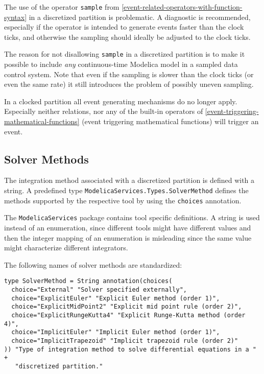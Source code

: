The use of the operator \lstinline!sample! from \cref{event-related-operators-with-function-syntax} in a discretized partition is problematic.
A diagnostic is recommended, especially if the operator is intended to generate events faster than the clock ticks, and otherwise the sampling should ideally be adjusted to the clock ticks.

\begin{nonnormative}
The reason for not disallowing \lstinline!sample! in a discretized partition is to make it possible to include \emph{any} continuous-time Modelica model in a sampled data control system.
Note that even if the sampling is slower than the clock ticks (or even the same rate) it still introduces the problem of possibly uneven sampling.
\end{nonnormative}

In a clocked partition all event generating mechanisms do no longer apply.
Especially neither relations, nor any of the built-in operators of \cref{event-triggering-mathematical-functions} (event triggering mathematical functions) will trigger an event.

\subsection{Solver Methods}\label{solver-methods}

The integration method associated with a discretized partition is defined with a string.
A predefined type \lstinline!ModelicaServices.Types.SolverMethod! defines the methods supported by the respective tool by using the \lstinline!choices! annotation.

\begin{nonnormative}
The \lstinline!ModelicaServices! package contains tool specific definitions.
A string is used instead of an enumeration, since different tools might have different values and then the integer mapping of an enumeration is misleading since the same value might characterize different integrators.
\end{nonnormative}

The following names of solver methods are standardized:
\begin{lstlisting}[language=modelica]
type SolverMethod = String annotation(choices(
  choice="External" "Solver specified externally",
  choice="ExplicitEuler" "Explicit Euler method (order 1)",
  choice="ExplicitMidPoint2" "Explicit mid point rule (order 2)",
  choice="ExplicitRungeKutta4" "Explicit Runge-Kutta method (order 4)",
  choice="ImplicitEuler" "Implicit Euler method (order 1)",
  choice="ImplicitTrapezoid" "Implicit trapezoid rule (order 2)"
)) "Type of integration method to solve differential equations in a " +
   "discretized partition."
\end{lstlisting}

